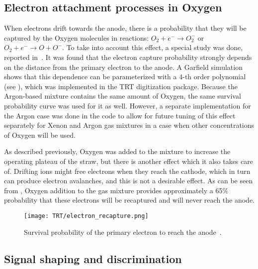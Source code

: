 \subsection{Electron attachment processes in Oxygen}
\label{subsec:recapture}
When electrons drift towards the anode, there is a probability that they will be captured by the Oxygen molecules in reactions:
$O_2 + e^- \to O_2^-$ or $O_2 + e^- \to O + O^-$. 
To take into account this effect, a special study was done, reported in~\cite{esben_thesis}.
It was found that the electron capture probability strongly depends on the distance from the primary electron to the anode.
A Garfield simulation shows that this dependence can be parameterized with a 4-th order polynomial (see ), 
which was implemented in the TRT digitization package. 
Because the Argon-based mixture contains the same amount of Oxygen, the same survival probability
curve was used for it as well. However, a separate implementation for the Argon case was done in the code to allow for future tuning of this effect separately for Xenon and Argon gas mixtures
in a case when other concentrations of Oxygen will be used.

As described previously, Oxygen was added to the mixture to increase the operating plateau of the straw, but there is another effect which it also takes care of.
Drifting ions might free electrons when they reach the cathode, which in turn can produce electron avalanches, and this is not a desirable effect.
As can be seen from , Oxygen addition to the gas mixture provides approximately a 65$\%$ probability that these electrons will be recaptured 
and will never reach the anode. 

\begin{figure}[h]
\centering
\texttt{[image: TRT/electron\_recapture.png]}
\caption{ 
 Survival probability of the primary electron to reach the anode~\cite{esben_thesis}.
}
\label{fig:electron_recapture}
\end{figure}

\subsection{Signal shaping and discrimination}

